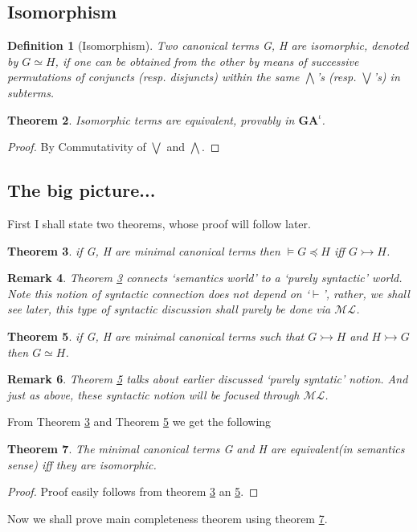 \documentclass[10pt]{article}
\newcommand{\ml}{\mathcal{ML}}
\newcommand{\id}{\iota}
\newcommand{\cle}{\preccurlyeq}
\newtheorem{theorem}{Theorem}
\newtheorem{definition}[theorem]{Definition}
\newtheorem{remark}[theorem]{Remark}
\begin{document}
		\subsection{Isomorphism}
		\begin{definition}[Isomorphism]
			Two canonical terms G, H are isomorphic, denoted by $G \simeq H$, if one can be obtained from the other by means of successive permutations
			of conjuncts (resp. disjuncts) within the same $\bigwedge$’s (resp. $\bigvee$’s) in subterms.
		\end{definition}
		\begin{theorem}\label{th15}
		Isomorphic terms are equivalent, provably in $\textbf{GA}^\id$.
		\end{theorem}
		\begin{proof}
			By Commutativity of $\bigvee$ and $\bigwedge$.
		\end{proof}
		
		\subsection{The big picture...}
		First I shall state two theorems, whose proof will follow later.
		\begin{theorem}\label{th16}
			if G, H are  minimal canonical terms then $\models G\cle H$ iff $G \rightarrowtail H$.
		\end{theorem}
		\begin{remark}
			Theorem \ref{th16} connects `semantics world' to a `purely syntactic' world. Note this notion of syntactic connection does not depend on `$\vdash$', rather, we shall see later, this type of syntactic discussion shall purely be done via $\ml$.
		\end{remark}
		\begin{theorem}\label{th17}
			if G, H are minimal canonical terms such that $G\rightarrowtail H$ and $H \rightarrowtail G$ then $G\simeq H$.
		\end{theorem}
		\begin{remark}
			Theorem \ref{th17} talks about earlier discussed `purely syntatic' notion. And just as above, these syntactic notion  will be focused through $\ml$.
		\end{remark}
		From Theorem \ref{th16} and Theorem \ref{th17} we get the following 
		\begin{theorem}\label{th18}
			The minimal canonical terms G and H are equivalent(in semantics sense) iﬀ
			they are isomorphic.
		\end{theorem}
		\begin{proof}
			Proof easily follows from theorem \ref{th16} an \ref{th17}.
		\end{proof}
		Now we shall prove main completeness theorem using theorem \ref{th18}.
		
\end{document}
